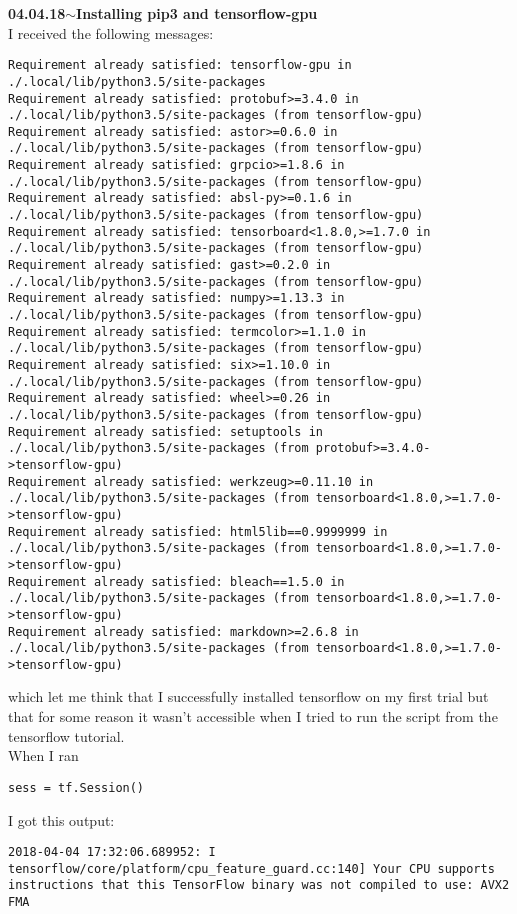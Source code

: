 \documentclass[11pt,a4paper]{article}
\newenvironment{loggentry}[2]%
{\noindent\textbf{#1}\hspace{1cm}$\mathbf{\sim}$\text{ }\textbf{#2}\\}{\vspace{0.5cm}}
\begin{document}
\begin{loggentry}{04.04.18}{Installing pip3 and tensorflow-gpu}
I received the following messages:
\begin{verbatim}
Requirement already satisfied: tensorflow-gpu in ./.local/lib/python3.5/site-packages
Requirement already satisfied: protobuf>=3.4.0 in ./.local/lib/python3.5/site-packages (from tensorflow-gpu)
Requirement already satisfied: astor>=0.6.0 in ./.local/lib/python3.5/site-packages (from tensorflow-gpu)
Requirement already satisfied: grpcio>=1.8.6 in ./.local/lib/python3.5/site-packages (from tensorflow-gpu)
Requirement already satisfied: absl-py>=0.1.6 in ./.local/lib/python3.5/site-packages (from tensorflow-gpu)
Requirement already satisfied: tensorboard<1.8.0,>=1.7.0 in ./.local/lib/python3.5/site-packages (from tensorflow-gpu)
Requirement already satisfied: gast>=0.2.0 in ./.local/lib/python3.5/site-packages (from tensorflow-gpu)
Requirement already satisfied: numpy>=1.13.3 in ./.local/lib/python3.5/site-packages (from tensorflow-gpu)
Requirement already satisfied: termcolor>=1.1.0 in ./.local/lib/python3.5/site-packages (from tensorflow-gpu)
Requirement already satisfied: six>=1.10.0 in ./.local/lib/python3.5/site-packages (from tensorflow-gpu)
Requirement already satisfied: wheel>=0.26 in ./.local/lib/python3.5/site-packages (from tensorflow-gpu)
Requirement already satisfied: setuptools in ./.local/lib/python3.5/site-packages (from protobuf>=3.4.0->tensorflow-gpu)
Requirement already satisfied: werkzeug>=0.11.10 in ./.local/lib/python3.5/site-packages (from tensorboard<1.8.0,>=1.7.0->tensorflow-gpu)
Requirement already satisfied: html5lib==0.9999999 in ./.local/lib/python3.5/site-packages (from tensorboard<1.8.0,>=1.7.0->tensorflow-gpu)
Requirement already satisfied: bleach==1.5.0 in ./.local/lib/python3.5/site-packages (from tensorboard<1.8.0,>=1.7.0->tensorflow-gpu)
Requirement already satisfied: markdown>=2.6.8 in ./.local/lib/python3.5/site-packages (from tensorboard<1.8.0,>=1.7.0->tensorflow-gpu)
\end{verbatim}
which let me think that I successfully installed tensorflow on my first trial but that for some reason it wasn't accessible when I tried to run the script from the tensorflow tutorial.\\
When I ran
\begin{verbatim}
sess = tf.Session()
\end{verbatim}
I got this output:\\
\begin{verbatim}
2018-04-04 17:32:06.689952: I tensorflow/core/platform/cpu_feature_guard.cc:140] Your CPU supports instructions that this TensorFlow binary was not compiled to use: AVX2 FMA

\end{verbatim}
\end{loggentry}
\end{document}
